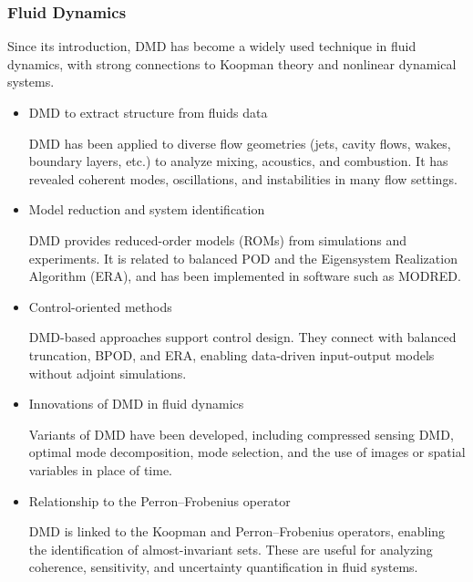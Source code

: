 \documentclass{article}
\begin{document}
\vspace{1cm}

\subsubsection*{Fluid Dynamics}

\vspace{1cm}

Since its introduction, DMD has become a widely used technique in fluid dynamics,
with strong connections to Koopman theory and nonlinear dynamical systems.

\begin{itemize}
    \item DMD to extract structure from fluids data
    
DMD has been applied to diverse flow geometries (jets, cavity flows, wakes,
boundary layers, etc.) to analyze mixing, acoustics, and combustion. 
It has revealed coherent modes, oscillations, and instabilities in many flow settings.

    \item Model reduction and system identification
    
DMD provides reduced-order models (ROMs) from simulations and experiments.
It is related to balanced POD and the Eigensystem Realization Algorithm (ERA),
and has been implemented in software such as MODRED.

    \item Control-oriented methods
    
DMD-based approaches support control design. They connect with balanced
truncation, BPOD, and ERA, enabling data-driven input-output models without
adjoint simulations.

    \item Innovations of DMD in fluid dynamics
    
Variants of DMD have been developed, including compressed sensing DMD,
optimal mode decomposition, mode selection, and the use of images or spatial
variables in place of time.

    \item Relationship to the Perron--Frobenius operator
    
DMD is linked to the Koopman and Perron--Frobenius operators, enabling the
identification of almost-invariant sets. These are useful for analyzing coherence,
sensitivity, and uncertainty quantification in fluid systems.
\end{itemize}
\end{document}
